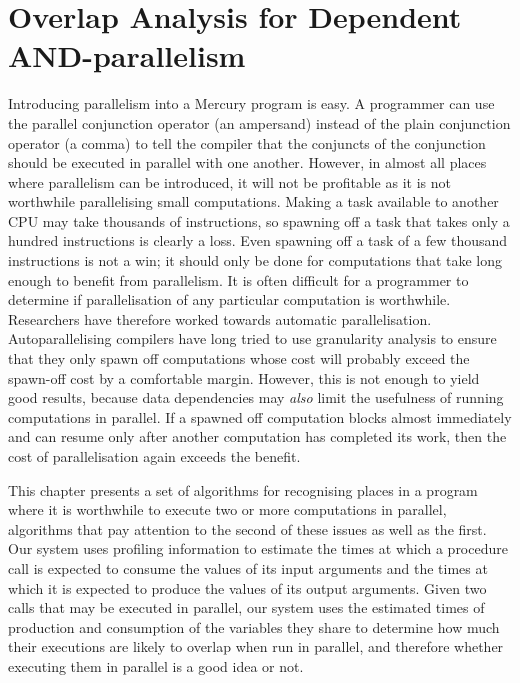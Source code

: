 
\chapter{Overlap Analysis for Dependent AND-parallelism}
\label{chap:overlap}


Introducing parallelism into a Mercury program is easy.
A programmer can use the parallel conjunction operator (an ampersand)
instead of the plain conjunction operator (a comma) to tell the compiler
that the conjuncts of the conjunction should be executed in parallel with
one another.
However,
in almost all places where parallelism can be introduced,
it will not be
profitable as it is not worthwhile parallelising small computations.
Making a task available to another CPU
may take thousands of instructions,
so spawning off a task that takes only a hundred instructions is clearly a
loss.
Even spawning off a task of a few thousand instructions is not a win;
it should only be done for computations
that take long enough to benefit from parallelism.
It is often difficult for a programmer to determine if parallelisation of
any particular computation is worthwhile.
Researchers have therefore worked towards automatic parallelisation.
Autoparallelising compilers have long tried to use granularity analysis to
ensure that they only spawn off computations whose cost will probably exceed
the spawn-off cost by a comfortable margin.
However, this is not enough to yield good results,
because data dependencies may \emph{also} limit
the usefulness of running computations in parallel.
If a spawned off computation blocks almost immediately
and can resume only after another computation has completed its work,
then the cost of parallelisation again exceeds the benefit.

%

This chapter presents a set of algorithms for recognising places in a
program where it is worthwhile to execute two or more computations in
parallel,
algorithms that pay attention to the second of these issues as well as the
first.
Our system uses profiling information to estimate the
times at which a procedure call is expected to consume the values of its
input arguments
and the times at which it is expected to produce the values of its output
arguments.
Given two calls that may be executed in parallel,
our system uses the estimated times of production and consumption
of the variables they share
to determine how much their executions are likely to overlap
when run in parallel,
and therefore whether executing them in parallel is a good idea or not.

